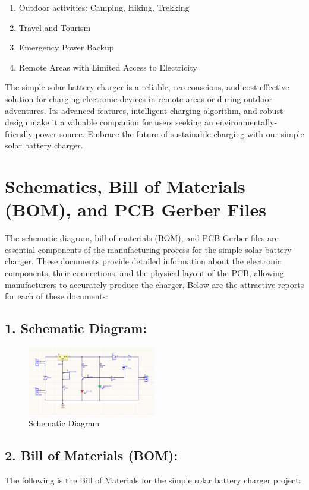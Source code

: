 \documentclass[twocolumn]{article}
\begin{document}
\begin{enumerate}
    \item Outdoor activities: Camping, Hiking, Trekking
    \item Travel and Tourism
    \item Emergency Power Backup
    \item Remote Areas with Limited Access to Electricity
\end{enumerate}

\noindent The simple solar battery charger is a reliable, eco-conscious, and cost-effective solution for charging electronic devices in remote areas or during outdoor adventures. Its advanced features, intelligent charging algorithm, and robust design make it a valuable companion for users seeking an environmentally-friendly power source. Embrace the future of sustainable charging with our simple solar battery charger.

\section*{Schematics, Bill of Materials (BOM), and PCB Gerber Files}
The schematic diagram, bill of materials (BOM), and PCB Gerber files are essential components of the manufacturing process for the simple solar battery charger. These documents provide detailed information about the electronic components, their connections, and the physical layout of the PCB, allowing manufacturers to accurately produce the charger. Below are the attractive reports for each of these documents:

\subsection*{1. Schematic Diagram:}

\begin{figure}[h]
\centering
\includegraphics[width=0.5\textwidth]{5.png}
\caption{Schematic Diagram}
\end{figure}

\subsection*{2. Bill of Materials (BOM):}
The following is the Bill of Materials for the simple solar battery charger project:
\end{document}
